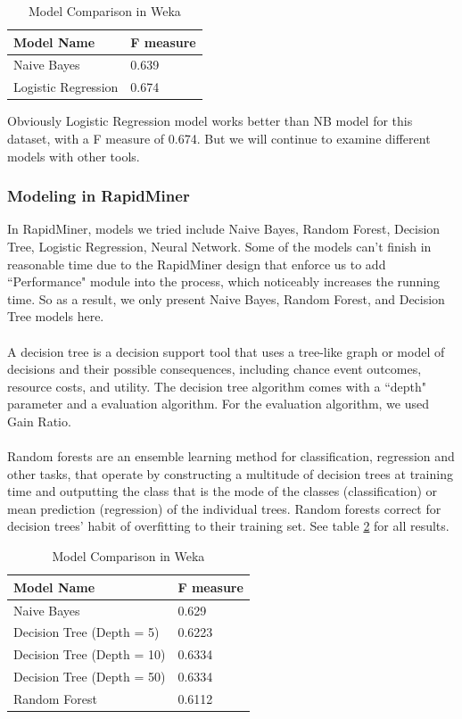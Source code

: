\documentclass[CEJM,PDF]{cej} %
\begin{document}
\begin{table}[h]
\centering
\caption{Model Comparison in Weka}
\label{weka-model}
\begin{tabular}{@{}|l|l|@{}}
\toprule
\hline
Model Name  & F measure \\ \midrule
\hline
Naive Bayes & 0.639   \\
\hline
Logistic Regression  & 0.674 \\ \bottomrule
\hline
\end{tabular}
\end{table}

Obviously Logistic Regression model works better than NB model for this dataset, with a F measure of 0.674. But we will continue to examine different models with other tools.\\

\subsubsection{Modeling in RapidMiner}
In RapidMiner, models we tried include Naive Bayes, Random Forest, Decision Tree, Logistic Regression, Neural Network. Some of the models can't finish in reasonable time due to the RapidMiner design that enforce us to add ``Performance" module into the process, which noticeably increases the running time. So as a result, we only present Naive Bayes, Random Forest, and Decision Tree models here. \\
\\
A decision tree is a decision support tool that uses a tree-like graph or model of decisions and their possible consequences, including chance event outcomes, resource costs, and utility. The decision tree algorithm comes with a ``depth" parameter and a evaluation algorithm. For the evaluation algorithm, we used Gain Ratio.\\
\\
Random forests are an ensemble learning method for classification, regression and other tasks, that operate by constructing a multitude of decision trees at training time and outputting the class that is the mode of the classes (classification) or mean prediction (regression) of the individual trees. Random forests correct for decision trees' habit of overfitting to their training set. See table \ref{rm-model} for all results.

\begin{table}[h]
\centering
\caption{Model Comparison in Weka}
\label{rm-model}
\begin{tabular}{@{}|l|l|@{}}
\toprule
\hline
Model Name  & F measure \\ \midrule
\hline
Naive Bayes & 0.629   \\
\hline
Decision Tree (Depth = 5) & 0.6223\\
\hline
Decision Tree (Depth = 10) & 0.6334 \\
\hline
Decision Tree (Depth = 50) & 0.6334 \\
\hline
Random Forest & 0.6112 \\ \bottomrule
\hline
\end{tabular}
\end{table}
\end{document}
